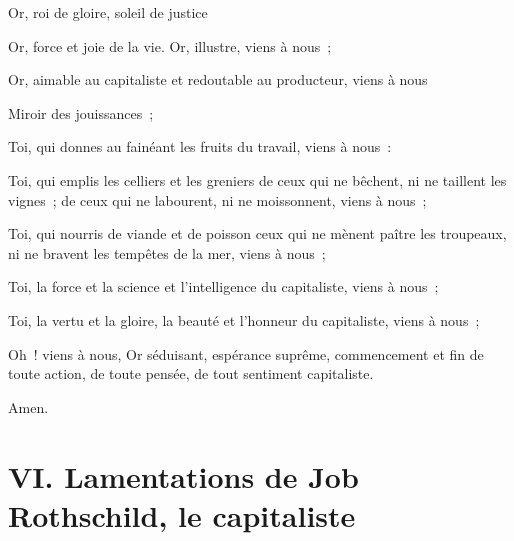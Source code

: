 \documentclass[french,twoside]{book} %
\begin{document}
\noindent Or, roi de gloire, soleil de justice\par
Or, force et joie de la vie. Or, illustre, viens à nous ;\par
Or, aimable au capitaliste et redoutable au producteur, viens à nous\par
Miroir des jouissances ;\par
Toi, qui donnes au fainéant les fruits du travail, viens à nous :\par
Toi, qui emplis les celliers et les greniers de ceux qui ne bêchent, ni ne taillent les vignes ; de ceux qui ne labourent, ni ne moissonnent, viens à nous ;\par
Toi, qui nourris de viande et de poisson ceux qui ne mènent paître les troupeaux, ni ne bravent les tempêtes de la mer, viens à nous ;\par
Toi, la force et la science et l’intelligence du capitaliste, viens à nous ;\par
Toi, la vertu et la gloire, la beauté et l’honneur du capitaliste, viens à nous ;\par
Oh ! viens à nous, Or séduisant, espérance suprême, commencement et fin de toute action, de toute pensée, de tout sentiment capitaliste.\par

\begin{center}
\noindent Amen.
\end{center}

\section[{VI. Lamentations de Job Rothschild, le capitaliste}]{VI. Lamentations de Job Rothschild, le capitaliste}\renewcommand{\leftmark}{VI. Lamentations de Job Rothschild, le capitaliste}
\end{document}
